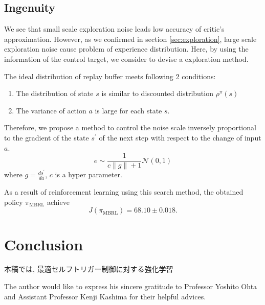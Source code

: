 \documentclass[english, dvipdfmx]{ampmt}             %
\begin{document}
\subsection{Ingenuity}
We see that small scale exploration noise leads low accuracy of critic's approximation. However, as we confirmed in section \ref{sec:exploration}, large scale exploration noise cause problem of experience distribution. Here, by using the information of the control target, we consider to devise a exploration method. \par
The ideal distribution of replay buffer meets following 2 conditions:
\begin{enumerate} 
	\item The distribution of state $s$ is similar to discounted distribution $\rho^{\pi}(s)$
	\item The variance of action $a$ is large for each state $s$.
\end{enumerate}
Therefore, we propose a method to control the noise scale inversely proportional to the gradient of the state $s^{\prime}$ of the next step with respect to the change of input $a$. 
\begin{equation}
	e \sim \frac{1}{c\|g\|+1} \mathcal{N}(0,1)
\end{equation}
where $g = \frac{ds^{\prime}}{da}$, $c$ is a hyper parameter. \par
As a result of reinforcement learning using this search method, the obtained policy $\pi_{\textrm{MBRL}}$ achieve
\begin{equation}
	J(\pi_{\textrm{MBRL}}) = 68.10 \pm 0.018 \label{ingenuity}.
\end{equation}


\section{Conclusion}
本稿では, 最適セルフトリガー制御に対する強化学習



\acknowledgment
The author would like to express his sincere gratitude to Professor
Yoshito Ohta and Assistant Professor Kenji Kashima for their helpful advices.
\end{document}
